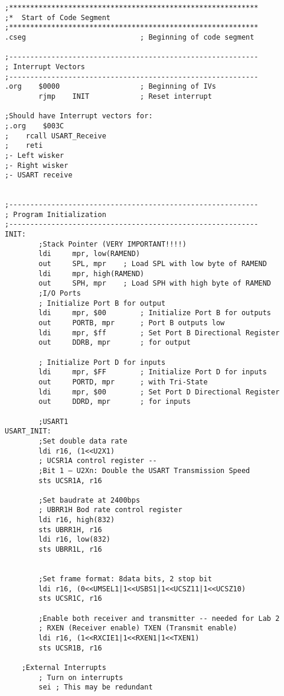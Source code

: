 \documentclass[12pt,letterpaper]{article}
\begin{document}
\begin{verbatim}
;***********************************************************
;*	Start of Code Segment
;***********************************************************
.cseg							; Beginning of code segment

;-----------------------------------------------------------
; Interrupt Vectors
;-----------------------------------------------------------
.org	$0000					; Beginning of IVs
		rjmp 	INIT			; Reset interrupt

;Should have Interrupt vectors for:
;.org    $003C
;    rcall USART_Receive
;    reti
;- Left wisker
;- Right wisker
;- USART receive


;-----------------------------------------------------------
; Program Initialization
;-----------------------------------------------------------
INIT:
        ;Stack Pointer (VERY IMPORTANT!!!!)
        ldi     mpr, low(RAMEND)
        out     SPL, mpr    ; Load SPL with low byte of RAMEND
        ldi     mpr, high(RAMEND)
        out     SPH, mpr    ; Load SPH with high byte of RAMEND
        ;I/O Ports
        ; Initialize Port B for output
        ldi     mpr, $00        ; Initialize Port B for outputs
        out     PORTB, mpr      ; Port B outputs low
        ldi     mpr, $ff        ; Set Port B Directional Register
        out     DDRB, mpr       ; for output

        ; Initialize Port D for inputs
        ldi     mpr, $FF        ; Initialize Port D for inputs
        out     PORTD, mpr      ; with Tri-State
        ldi     mpr, $00        ; Set Port D Directional Register
        out     DDRD, mpr       ; for inputs

        ;USART1
USART_INIT:
        ;Set double data rate
        ldi r16, (1<<U2X1)
        ; UCSR1A control register --
        ;Bit 1 – U2Xn: Double the USART Transmission Speed
        sts UCSR1A, r16

        ;Set baudrate at 2400bps
        ; UBRR1H Bod rate control register
        ldi r16, high(832)
        sts UBRR1H, r16
        ldi r16, low(832)
        sts UBRR1L, r16


		;Set frame format: 8data bits, 2 stop bit
        ldi r16, (0<<UMSEL1|1<<USBS1|1<<UCSZ11|1<<UCSZ10)
        sts UCSR1C, r16

        ;Enable both receiver and transmitter -- needed for Lab 2
        ; RXEN (Receiver enable) TXEN (Transmit enable)
        ldi r16, (1<<RXCIE1|1<<RXEN1|1<<TXEN1) 
        sts UCSR1B, r16

	;External Interrupts
        ; Turn on interrupts
        sei ; This may be redundant


\end{verbatim}
\end{document}

